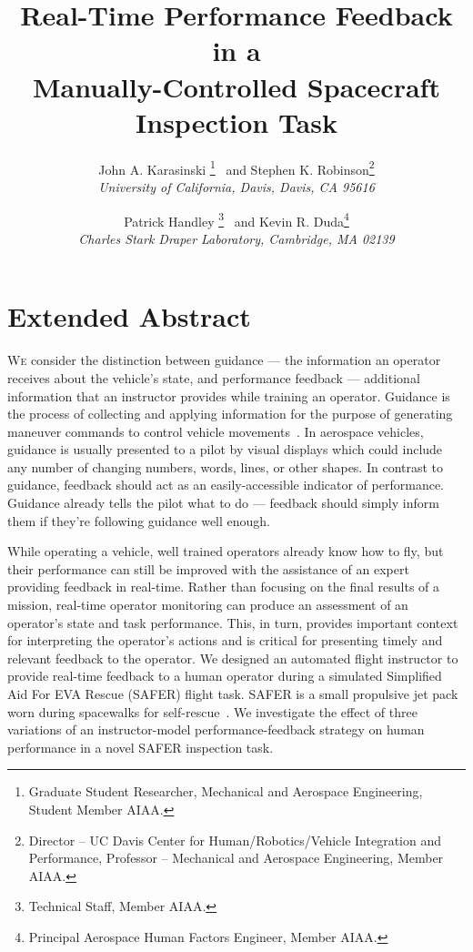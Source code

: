 \documentclass[]{aiaa-tc}%
\title{Real-Time Performance Feedback in a \\Manually-Controlled Spacecraft Inspection Task}
\author{
  John A. Karasinski%
    \thanks{Graduate Student Researcher, Mechanical and Aerospace Engineering, Student Member AIAA.}
  \ and Stephen K. Robinson\thanks{Director – UC Davis Center for Human/Robotics/Vehicle Integration and Performance, Professor – Mechanical and Aerospace Engineering, Member AIAA.}\\
  {\normalsize\itshape
   University of California, Davis, Davis, CA 95616}\\
  \and
  Patrick Handley%
    \thanks{Technical Staff, Member AIAA.}
  \ and Kevin R. Duda\thanks{Principal Aerospace Human Factors Engineer, Member AIAA.}\\
  {\normalsize\itshape
   Charles Stark Draper Laboratory, Cambridge, MA 02139}\\
 }
\begin{document}
\maketitle

\section{Extended Abstract}
\lettrine[nindent=0pt]{W}{e} consider the distinction between guidance --- the information an operator receives about the vehicle's state, and performance feedback --- additional information that an instructor provides while training an operator. Guidance is the process of collecting and applying information for the purpose of generating maneuver commands to control vehicle movements~\cite{draper1965guidance}. In aerospace vehicles, guidance is usually presented to a pilot by visual displays which could include any number of changing numbers, words, lines, or other shapes. In contrast to guidance, feedback should act as an easily-accessible indicator of performance. Guidance already tells the pilot what to do --- feedback should simply inform them if they're following guidance well enough.


While operating a vehicle, well trained operators already know how to fly, but their performance can still be improved with the assistance of an expert providing feedback in real-time. Rather than focusing on the final results of a mission, real-time operator monitoring can produce an assessment of an operator's state and task performance. This, in turn, provides important context for interpreting the operator's actions and is critical for presenting timely and relevant feedback to the operator. We designed an automated flight instructor to provide real-time feedback to a human operator during a simulated Simplified Aid For EVA Rescue (SAFER) flight task. SAFER is a small propulsive jet pack worn during spacewalks for self-rescue~\cite{safer}. We investigate the effect of three variations of an instructor-model performance-feedback strategy on human performance in a novel SAFER inspection task.
\end{document}
